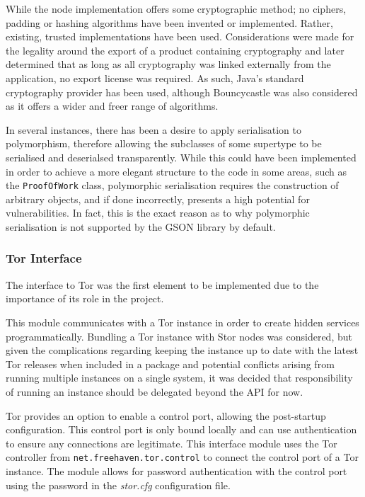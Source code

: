 			While the node implementation offers some cryptographic method; no ciphers, padding or hashing algorithms have been invented or implemented. Rather, existing, trusted implementations have been used. Considerations were made for the legality around the export of a product containing cryptography and later determined that as long as all cryptography was linked externally from the application, no export license was required. As such, Java's standard cryptography provider has been used, although Bouncycastle was also considered as it offers a wider and freer range of algorithms.
			
			In several instances, there has been a desire to apply serialisation to polymorphism, therefore allowing the subclasses of some supertype to be serialised and deserialsed transparently. While this could have been implemented in order to achieve a more elegant structure to the code in some areas, such as the \texttt{ProofOfWork} class, polymorphic serialisation requires the construction of arbitrary objects, and if done incorrectly, presents a high potential for vulnerabilities. In fact, this is the exact reason as to why polymorphic serialisation is not supported by the GSON library by default.
			
		\subsubsection*{Tor Interface}
			The interface to Tor was the first element to be implemented due to the importance of its role in the project.
			
			This module communicates with a Tor instance in order to create hidden services programmatically. Bundling a Tor instance with Stor nodes was considered, but given the complications regarding keeping the instance up to date with the latest Tor releases when included in a package and potential conflicts arising from running multiple instances on a single system, it was decided that responsibility of running an instance should be delegated beyond the API for now.
			
			Tor provides an option to enable a control port, allowing the post-startup configuration. This control port is only bound locally and can use authentication to ensure any connections are legitimate. This interface module uses the Tor controller from \texttt{net.freehaven.tor.control} to connect the control port of a Tor instance. The module allows for password authentication with the control port using the password in the \textit{stor.cfg} configuration file.
